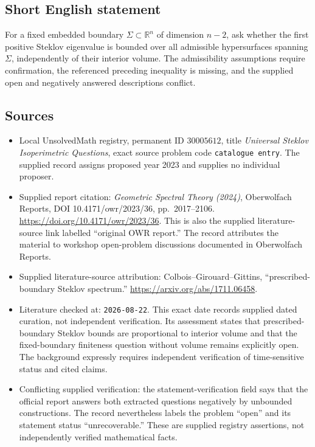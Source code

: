 \documentclass[11pt]{article}
\newcommand{\R}{\mathbb{R}}
\begin{document}
\subsection{Short English statement}
For a fixed embedded boundary \(\Sigma\subset\R^n\) of dimension \(n-2\), ask whether the first positive Steklov eigenvalue is bounded over all admissible hypersurfaces spanning \(\Sigma\), independently of their interior volume. The admissibility assumptions require confirmation, the referenced preceding inequality is missing, and the supplied open and negatively answered descriptions conflict.
\subsection{Sources}
\begin{itemize}
\item Local UnsolvedMath registry, permanent ID \(30005612\), title \emph{Universal Steklov Isoperimetric Questions}, exact source problem code \texttt{catalogue entry}. The supplied record assigns proposed year 2023 and supplies no individual proposer.
\item Supplied report citation: \emph{Geometric Spectral Theory (2024)}, Oberwolfach Reports, DOI 10.4171/owr/2023/36, pp.~2017--2106. \url{https://doi.org/10.4171/owr/2023/36}. This is also the supplied literature-source link labelled ``original OWR report.'' The record attributes the material to workshop open-problem discussions documented in Oberwolfach Reports.
\item Supplied literature-source attribution: Colbois--Girouard--Gittins, ``prescribed-boundary Steklov spectrum.'' \url{https://arxiv.org/abs/1711.06458}.
\item Literature checked at: \texttt{2026-08-22}. This exact date records supplied dated curation, not independent verification. Its assessment states that prescribed-boundary Steklov bounds are proportional to interior volume and that the fixed-boundary finiteness question without volume remains explicitly open. The background expressly requires independent verification of time-sensitive status and cited claims.
\item Conflicting supplied verification: the statement-verification field says that the official report answers both extracted questions negatively by unbounded constructions. The record nevertheless labels the problem ``open'' and its statement status ``unrecoverable.'' These are supplied registry assertions, not independently verified mathematical facts.
\end{itemize}
\end{document}
